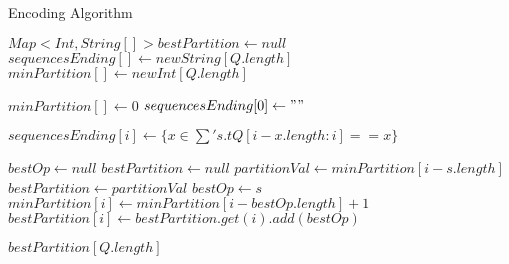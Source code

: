 \begin{algorithm}
\caption{Encoding Algorithm}
\label{Encoding Algorithm}
\begin{algorithmic}[1]

\State $Map<Int,String[]> bestPartition \gets null$
\State $sequencesEnding[] \gets new String[Q.length]$
\State $minPartition[] \gets new Int[Q.length]$

\State $minPartition[] \gets 0$
\State $sequencesEnding[0] \gets ""$

	 $sequencesEnding[i] \gets \{x \in \sum' s.t Q[i-x.length:i] == x\}$
\EndFor

	\State $bestOp \gets null$
	\State $bestPartition \gets null$ 
		\State $partitionVal \gets minPartition[i-s.length]$
			\State $bestPartition \gets partitionVal$ 
			\State $bestOp \gets s$
		\EndIf
	\EndFor
	\State $minPartition[i] \gets minPartition[i-bestOp.length] + 1$
	\State $bestPartition[i] \gets bestPartition.get(i).add(bestOp) $
\EndFor

\Return $bestPartition[Q.length]$

\EndProcedure
\end{algorithmic}
\end{algorithm}